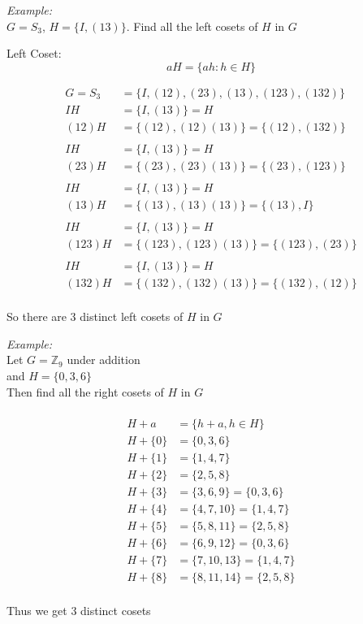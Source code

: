 \documentclass[11pt,letterpaper]{article}
\newenvironment{example}                             
        {\noindent\textit{Example:}\\}
	{}
\begin{document}
\begin{example}
  $ G = S_3 $, $H = \{I, (13)\}$. Find all the left cosets of $H$ in $G$

  Left Coset: 
  \[
    aH = \{ah : h \in H\}
  \]

  \begin{align*}
    G = S_3 &= \{I, (12), (23), (13), (123), (132)\}\\
        IH  &= \{I, (13)\} = H\\ 
        (12)H &= \{(12), (12)(13)\} = \{(12), (132)\}\\
        \\
        IH  &= \{I, (13)\} = H\\ 
        (23)H &= \{(23), (23)(13)\} = \{(23), (123)\}\\
        \\
        IH  &= \{I, (13)\} = H\\ 
        (13)H &= \{(13), (13)(13)\} = \{(13), I\}\\
        \\
        IH  &= \{I, (13)\} = H\\ 
        (123)H &= \{(123), (123)(13)\} = \{(123), (23)\}\\
        \\
        IH  &= \{I, (13)\} = H\\ 
        (132)H &= \{(132), (132)(13)\} = \{(132), (12)\}\\
  \end{align*}

  So there are 3 distinct left cosets of $H$ in $G$
\end{example}

\begin{example}
  Let $G = \mathbb{Z}_9$ under addition\\
  and $H = \{0,3,6\}$\\
  Then find all the right cosets of $H$ in $G$\\ 
  \\ 
  \begin{align*}
    H+a &= \{h+a, h\in H\}\\
    H+\{0\} &= \{0,3,6\}\\
    H+\{1\} &= \{1,4,7\}\\
    H+\{2\} &= \{2,5,8\}\\
    H+\{3\} &= \{3,6,9\} = \{0,3,6\}\\
    H+\{4\} &= \{4,7,10\} = \{1, 4, 7\}\\
    H+\{5\} &= \{5,8,11\}= \{2, 5, 8\}\\
    H+\{6\} &= \{6,9,12\}= \{0, 3, 6\}\\
    H+\{7\} &= \{7,10,13\}= \{1, 4, 7\}\\
    H+\{8\} &= \{8,11,14\}= \{2, 5, 8\}\\
  \end{align*}
  
  Thus we get 3 distinct cosets
\end{example}
\end{document}
